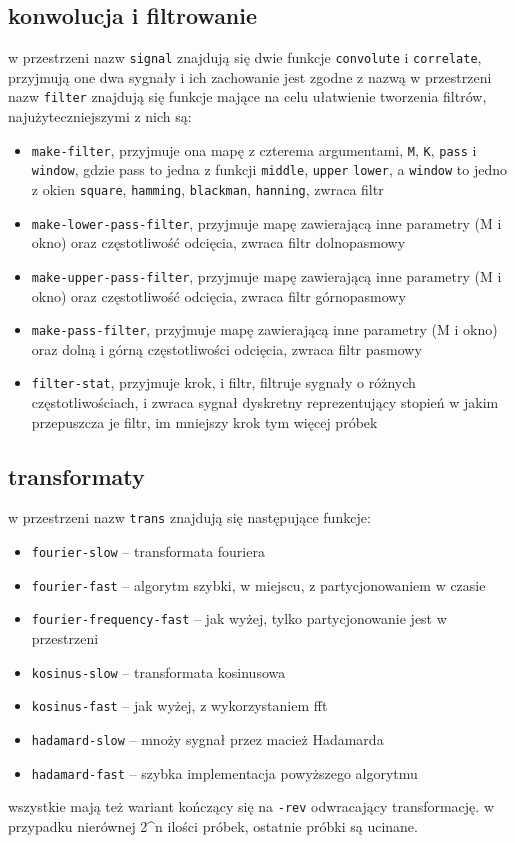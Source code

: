 \documentclass[12pt]{article}
\newcommand{\cljt}[1]{\texttt{#1}}
\begin{document}
\subsection{konwolucja i filtrowanie}
w przestrzeni nazw \cljt{signal} znajdują się dwie funkcje \cljt{convolute} i
\cljt{correlate}, przyjmują one dwa sygnały i ich zachowanie jest zgodne z nazwą
w przestrzeni nazw \cljt{filter} znajdują się funkcje mające na celu ułatwienie
tworzenia filtrów, najużyteczniejszymi z nich są:
\begin{itemize}
	\item \cljt{make-filter}, przyjmuje ona mapę z czterema argumentami, \cljt{M}, \cljt{K}, \cljt{pass}
	      i \cljt{window}, gdzie pass to jedna z funkcji \cljt{middle}, \cljt{upper}
	      \cljt{lower}, a \cljt{window} to jedno z okien \cljt{square},
	      \cljt{hamming}, \cljt{blackman}, \cljt{hanning}, zwraca filtr
	\item \cljt{make-lower-pass-filter}, przyjmuje mapę zawierającą inne parametry
	      (M i okno) oraz częstotliwość odcięcia, zwraca filtr dolnopasmowy
	\item \cljt{make-upper-pass-filter}, przyjmuje mapę zawierającą inne parametry
	      (M i okno) oraz częstotliwość odcięcia, zwraca filtr górnopasmowy
	\item \cljt{make-pass-filter}, przyjmuje mapę zawierającą inne parametry
	      (M i okno) oraz dolną i górną częstotliwości odcięcia, zwraca filtr pasmowy
	\item \cljt{filter-stat}, przyjmuje krok, i filtr, filtruje
	      sygnały o różnych częstotliwościach, i zwraca sygnał dyskretny
	      reprezentujący stopień w jakim przepuszcza je filtr, im mniejszy krok
	      tym więcej próbek
\end{itemize}
\subsection{transformaty}
w przestrzeni nazw \cljt{trans} znajdują się następujące funkcje:
\begin{itemize}
	\item \cljt{fourier-slow} -- transformata fouriera
	\item \cljt{fourier-fast} -- algorytm szybki, w miejscu, z partycjonowaniem w czasie
	\item \cljt{fourier-frequency-fast} -- jak wyżej, tylko partycjonowanie jest w przestrzeni
	\item \cljt{kosinus-slow} -- transformata kosinusowa
	\item \cljt{kosinus-fast} -- jak wyżej, z wykorzystaniem fft
	\item \cljt{hadamard-slow} -- mnoży sygnał przez macież Hadamarda
	\item \cljt{hadamard-fast} -- szybka implementacja powyższego algorytmu
\end{itemize}
wszystkie mają też wariant kończący się na \cljt{-rev} odwracający
transformację.
w przypadku nierównej 2^n ilości próbek, ostatnie próbki są ucinane.
\end{document}
